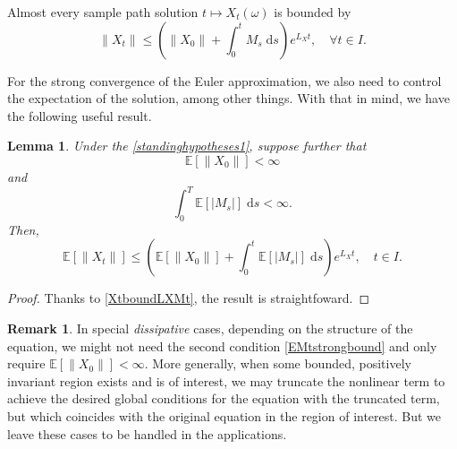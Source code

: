 \documentclass[reqno,12pt]{amsart}
\theoremstyle{plain} %
\newtheorem{lemma}{Lemma}[section]
\theoremstyle{definition} %
\newtheorem{remark}{Remark}[section]
\begin{document}
Almost every sample path solution $t \mapsto X_t(\omega)$ is bounded by
\begin{equation}
    \label{XtboundLXMt}
    \|X_t\| \leq \left(\|X_0\| + \int_0^t M_s\;\mathrm{d}s\right) e^{L_X t}, \quad \forall t\in I.
\end{equation}

For the strong convergence of the Euler approximation, we also need to control the expectation of the solution, among other things. With that in mind, we have the following useful result.
\begin{lemma}
    Under the \cref{standinghypotheses1}, suppose further that
    \begin{equation}
        \label{EX0strongbound}
        \mathbb{E}[\|X_0\|] < \infty
    \end{equation}
    and
    \begin{equation}
        \label{EMtstrongbound}
        \int_0^T \mathbb{E}[|M_s|] \;\mathrm{d}s < \infty.
    \end{equation}
    Then,
    \begin{equation}
        \label{EXtstrongbound}
        \mathbb{E}[\|X_t\|] \leq \left(\mathbb{E}[\|X_0\|] + \int_0^t \mathbb{E}[|M_s|]\;\mathrm{d}s\right) e^{L_X t}, \quad t\in I.
    \end{equation}
\end{lemma}

\begin{proof}
    Thanks to \eqref{XtboundLXMt}, the result is straightfoward.
\end{proof}


\begin{remark}
    In special \emph{dissipative} cases, depending on the structure of the equation, we might not need the second condition \eqref{EMtstrongbound} and only require $\mathbb{E}[\|X_0\|] < \infty$. More generally, when some bounded, positively invariant region exists and is of interest, we may truncate the nonlinear term to achieve the desired global conditions for the equation with the truncated term, but which coincides with the original equation in the region of interest. But we leave these cases to be handled in the applications.
\end{remark}
\end{document}
